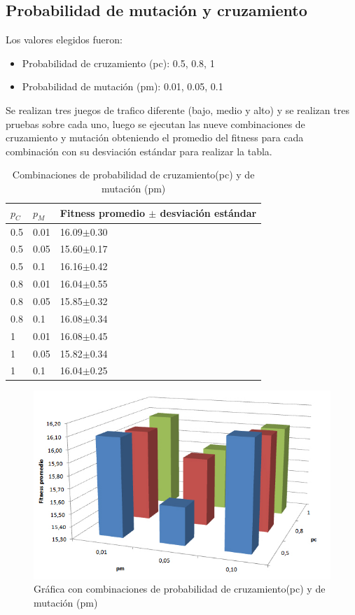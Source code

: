 \subsection{Probabilidad de mutación y cruzamiento}

Los valores elegidos fueron:

\begin{itemize}
	\item Probabilidad de cruzamiento (pc):  0.5, 0.8, 1
	\item Probabilidad de  mutación (pm):  0.01, 0.05, 0.1
\end{itemize}

Se realizan tres juegos de trafico diferente (bajo, medio y alto) y se realizan tres pruebas sobre cada uno, luego se ejecutan las nueve combinaciones de cruzamiento y mutación obteniendo el promedio del fitness para cada combinación con su desviación estándar para realizar la tabla.


 
 \begin{table}[h]
 	\renewcommand{\arraystretch}{1.2}
 	\caption{Combinaciones de probabilidad de cruzamiento(pc) y de mutación (pm)}
 	\label{table:parametro_mutacion_cruzamiento}
 	\centering
 	\begin{tabular}{p{1cm}p{1cm}p{3.5cm} }
 		\hline
 		$p_C$& 
 		$p_M$ & 
 		Fitness promedio  $\pm$ desviación estándar\\ 
 		\hline
 		0.5 & 0.01  &  16.09$\pm$0.30\\
 		0.5 & 0.05 &  15.60$\pm$0.17\\
 		0.5 & 0.1  &  16.16$\pm$0.42\\
 		0.8 & 0.01  &  16.04$\pm$0.55\\
 		0.8 & 0.05  &  15.85$\pm$0.32\\
 		0.8 & 0.1  &  16.08$\pm$0.34\\
 		1 & 0.01 &  16.08$\pm$0.45\\
 		1 & 0.05 &  15.82$\pm$0.34\\
 		1 & 0.1 &  16.04$\pm$0.25\\
 		\hline
 	\end{tabular}
 \end{table}
 
 
 

\begin{figure}[h]
	\centering
	\includegraphics[width=0.7\linewidth]{Figures/grafica_mutacion_cruzamiento}
	\caption{Gráfica con combinaciones de probabilidad de cruzamiento(pc) y de mutación (pm)}
	\label{fig:grafica_mutacion_cruzamiento}
\end{figure}

